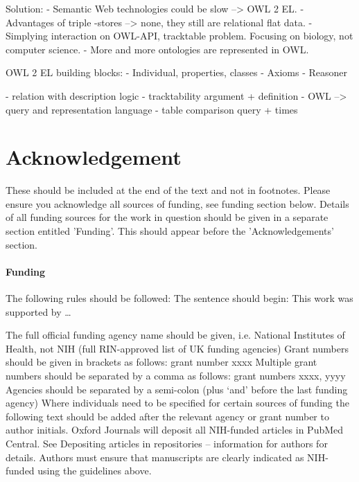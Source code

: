 \documentclass{bioinfo}
\begin{document}
Solution:
- Semantic Web technologies could be slow --> OWL 2 EL.
- Advantages of triple -stores --> none, they still are relational flat data.
- Simplying interaction on OWL-API, tracktable problem. Focusing on biology, not computer science.
- More and more ontologies are represented in OWL.

OWL 2 EL building blocks:
- Individual, properties, classes
- Axioms
- Reasoner

- relation with description logic
- tracktability argument + definition
- OWL --> query and representation language
- table comparison query + times



\section*{Acknowledgement}
These should be included at the end of the text and not in footnotes. Please ensure you acknowledge all 
sources of funding, see funding section below.
Details of all funding sources for the work in question should be given 
in a separate section entitled 'Funding'. This should appear before the 'Acknowledgements' section.

\paragraph{Funding\textcolon}
The following rules should be followed:
The sentence should begin: This work was supported by …
 
The full official funding agency name should be given, i.e. National Institutes of Health, not NIH 
(full RIN-approved list of UK funding agencies) Grant numbers should be given in brackets as follows: grant number xxxx 
Multiple grant numbers should be separated by a comma as follows: grant numbers xxxx, yyyy 
Agencies should be separated by a semi-colon (plus ‘and’ before the last funding agency) 
Where individuals need to be specified for certain sources of funding the following text should be added after the
relevant agency or grant number to author initials.
Oxford Journals will deposit all NIH-funded articles in PubMed Central. See Depositing articles in repositories – 
information for authors for details. Authors must ensure that manuscripts are clearly indicated as NIH-funded using the guidelines above.










\end{document}
